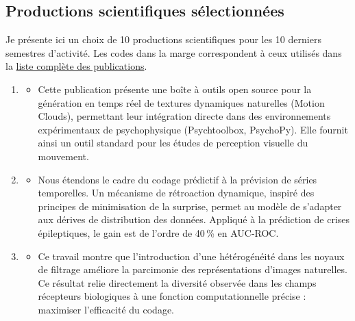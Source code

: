 \documentclass[10pt,french,a4paper]{article}%
\begin{document}
\newpage
\subsection{Productions scientifiques sélectionnées}

Je présente ici un choix de 10 productions scientifiques pour les 10 derniers
semestres d’activité. Les codes dans la marge correspondent à ceux utilisés dans la \href{https://raw.githubusercontent.com/laurentperrinet/perrinet_curriculum-vitae.tex/master/perrinet_publications.pdf}{liste complète des publications}.


\begin{enumerate}%


\item[A58] %
\begin{itemize}
  \item Cette publication présente une boîte à outils open source pour la génération en temps réel de textures dynamiques naturelles (Motion Clouds), permettant leur intégration directe dans des environnements expérimentaux de psychophysique (Psychtoolbox, PsychoPy). Elle fournit ainsi un outil standard pour les études de perception visuelle du mouvement.
\end{itemize}

\item[A57] %
\begin{itemize}
  \item Nous étendons le cadre du codage prédictif à la prévision de séries temporelles. Un mécanisme de rétroaction dynamique, inspiré des principes de minimisation de la surprise, permet au modèle de s'adapter aux dérives de distribution des données. Appliqué à la prédiction de crises épileptiques, le gain est de l'ordre de 40\,\% en AUC-ROC.
\end{itemize}

\item[A56] %
\begin{itemize}
  \item Ce travail montre que l'introduction d'une hétérogénéité dans les noyaux de filtrage améliore la parcimonie des représentations d'images naturelles. Ce résultat relie directement la diversité observée dans les champs récepteurs biologiques à une fonction computationnelle précise : maximiser l'efficacité du codage.
\end{itemize}


\end{enumerate}
\end{document}
